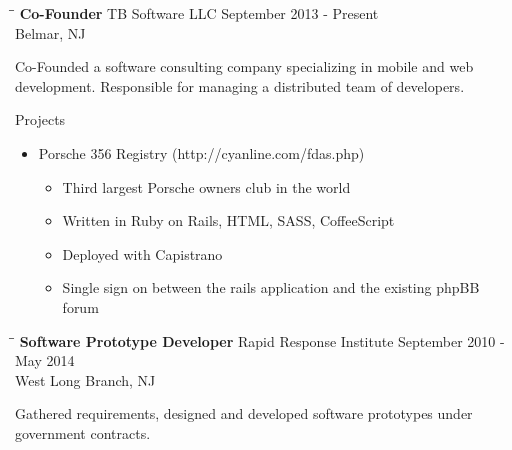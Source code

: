 \documentclass{res}
\begin{document}
\begin{resume}
   \begin{tabbing}
   \hspace{2.3in}\= \hspace{2.6in}\= \kill %
    {\bf Co-Founder} \>TB Software LLC     \>September 2013 - Present\\
                             \>Belmar, NJ
   \end{tabbing}\vspace{-20pt}      %
    Co-Founded a software consulting company specializing in mobile and web development. 
    Responsible for managing a distributed team of developers.

    Projects
    \begin{itemize}
        \item Porsche 356 Registry (http://cyanline.com/fdas.php)
        \begin{itemize}
            \item Third largest Porsche owners club in the world
            \item Written in Ruby on Rails, HTML, SASS, CoffeeScript
            \item Deployed with Capistrano
            \item Single sign on between the rails application and the existing phpBB forum
        \end{itemize}
    \end{itemize}

   \begin{tabbing}
   \hspace{2.3in}\= \hspace{2.6in}\= \kill %
    {\bf Software Prototype Developer} \>Rapid Response Institute     \>September 2010 - May 2014\\
                             \>West Long Branch, NJ
   \end{tabbing}\vspace{-20pt}      %
   Gathered requirements, designed and developed software prototypes under government contracts.


\end{resume}
\end{document}
